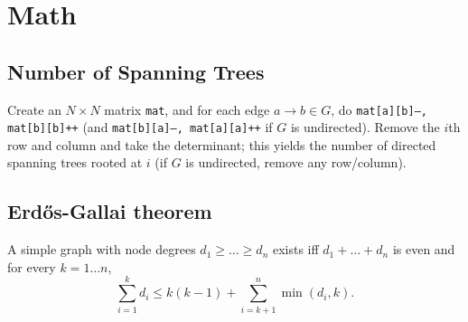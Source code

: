 \section{Math}
	\subsection{Number of Spanning Trees}
		Create an $N\times N$ matrix \texttt{mat}, and for each edge $a \rightarrow b \in G$, do
		\texttt{mat[a][b]--, mat[b][b]++} (and \texttt{mat[b][a]--, mat[a][a]++} if $G$ is undirected).
		Remove the $i$th row and column and take the determinant; this yields the number of directed spanning trees rooted at $i$
		(if $G$ is undirected, remove any row/column).

	\subsection{Erdős-Gallai theorem}
		A simple graph with node degrees $d_1 \ge \dots \ge d_n$ exists iff $d_1 + \dots + d_n$ is even and for every $k = 1\dots n$,
		\[ \sum _{i=1}^{k}d_{i}\leq k(k-1)+\sum _{i=k+1}^{n}\min(d_{i},k). \]
